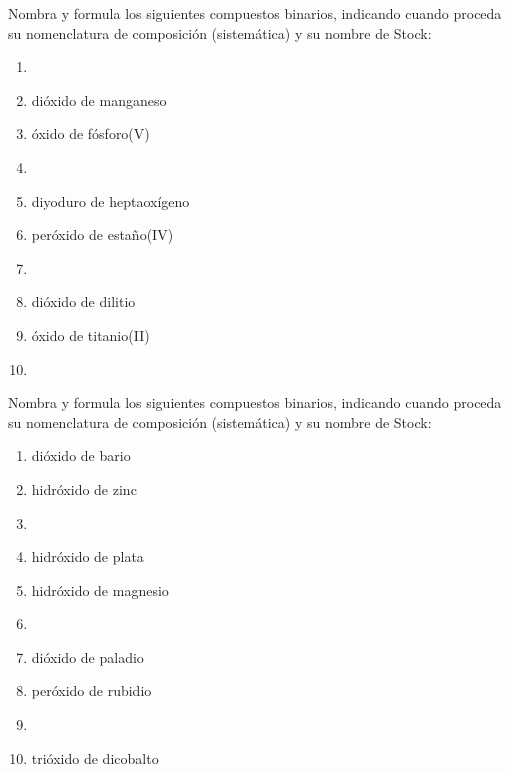 \documentclass[10pt]{article}
\begin{document}
\begin{exercise}[
    tags    = {inorgánica,compuestos binarios,óxidos,peróxidos},
    topics  = {química inorgánica,formulación,nomenclatura},
    source  = {SAN Formulación, p27, e32},
  ]

  Nombra y formula los siguientes compuestos binarios, indicando cuando proceda su nomenclatura de composición (sistemática) y su nombre de Stock:

  \begin{enumerate}
    \item {}
    \item dióxido de manganeso
    \item óxido de fósforo(V)
    \item {}
    \item diyoduro de heptaoxígeno
    \item peróxido de estaño(IV)
    \item {}
    \item dióxido de dilitio
    \item óxido de titanio(II)
    \item {}
  \end{enumerate}
\end{exercise}


\begin{exercise}[
    tags    = {inorgánica,compuestos binarios,óxidos,peróxidos,hidróxidos},
    topics  = {química inorgánica,formulación,nomenclatura},
    source  = {SAN Formulación, p27, e33},
  ]

  Nombra y formula los siguientes compuestos binarios, indicando cuando proceda su nomenclatura de composición (sistemática) y su nombre de Stock:

  \begin{enumerate}
    \item dióxido de bario
    \item hidróxido de zinc
    \item {}
    \item hidróxido de plata
    \item hidróxido de magnesio
    \item {}
    \item dióxido de paladio
    \item peróxido de rubidio
    \item {}
    \item trióxido de dicobalto
  \end{enumerate}
\end{exercise}
\end{document}
